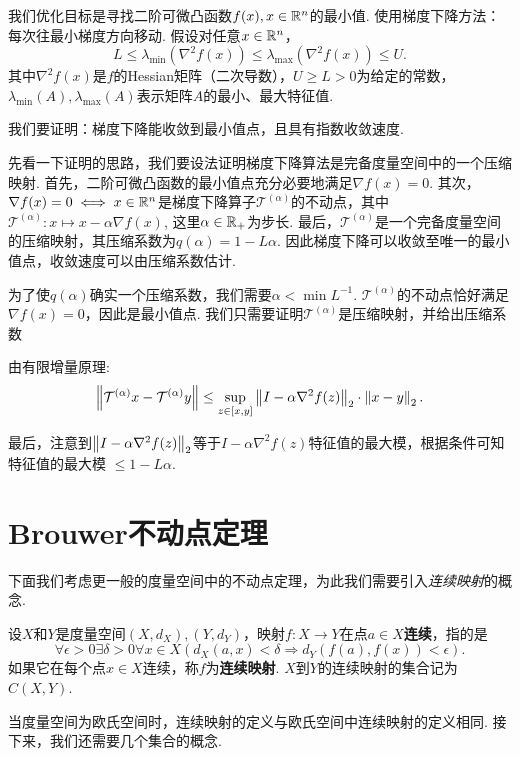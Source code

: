 \begin{example}[梯度下降的收敛性]\label{ex:gradient-descent}
我们优化目标是寻找二阶可微凸函数$f(x),x\in \mathbb{R}^n$的最小值. 使用梯度下降方法：每次往最小梯度方向移动.
假设对任意$x\in \mathbb{R}^n$，
    \[L \le \lambda_{\min}(\nabla^2 f(x))\le \lambda_{\max}(\nabla^2 f(x))\le U.\]
    其中$\nabla^2f(x)$是$f$的Hessian矩阵（二次导数），$U\ge L>0$为给定的常数，$\lambda_{\min}(A),\lambda_{\max}(A)$表示矩阵$A$的最小、最大特征值.

我们要证明：梯度下降能收敛到最小值点，且具有指数收敛速度.

先看一下证明的思路，我们要设法证明梯度下降算法是完备度量空间中的一个压缩映射. 首先，二阶可微凸函数的最小值点充分必要地满足$\nabla f(x)=0$. 其次，$\nabla f(x)=0 \iff x\in\mathbb{R}^n$是梯度下降算子$\mathcal T^{(\alpha)}$的不动点，其中$\mathcal T^{(\alpha)}: x\mapsto x - \alpha\nabla f(x)$, 这里$\alpha\in \mathbb{R}_+$为步长. 最后，$\mathcal T^{(\alpha)}$是一个完备度量空间的压缩映射，其压缩系数为$q(\alpha)=1-L\alpha$. 因此梯度下降可以收敛至唯一的最小值点，收敛速度可以由压缩系数估计.

为了使$q(\alpha)$确实一个压缩系数，我们需要$\alpha<\min L^{-1}$. $\mathcal T^{(\alpha)}$的不动点恰好满足$\nabla f(x)=0$，因此是最小值点. 我们只需要证明$\mathcal T^{(\alpha)}$是压缩映射，并给出压缩系数

由有限增量原理:
    \[\left\|\mathcal T^{(\alpha)}x - \mathcal T^{(\alpha)}y\right\| \le \sup_{z\in[x,y]}\left\|I - \alpha \nabla^2 f(z)\right\|_2\cdot\left\|x-y\right\|_2.\]
    \item 最后，注意到$\left\|I-\alpha\nabla^2f(z)\right\|_2$等于$I-\alpha\nabla^2f(z)$特征值的最大模，根据条件可知特征值的最大模 $\leq 1-L\alpha$.
\end{example}

\section{Brouwer不动点定理}
下面我们考虑更一般的度量空间中的不动点定理，为此我们需要引入\emph{连续映射}的概念. 

\begin{definition}
设$X$和$Y$是度量空间$(X,d_X),(Y,d_Y)$，映射$f:X\to Y$在点$a\in X$\textbf{连续}，指的是
    \[\forall\epsilon>0\exists\delta>0\forall x\in X(d_X(a,x) < \delta\Rightarrow d_Y(f(a),f(x))<\epsilon).\]
如果它在每个点$x\in X$连续，称$f$为\textbf{连续映射}. $X$到$Y$的连续映射的集合记为$C(X,Y)$. 
\end{definition}

当度量空间为欧氏空间时，连续映射的定义与欧氏空间中连续映射的定义相同. 接下来，我们还需要几个集合的概念. 

